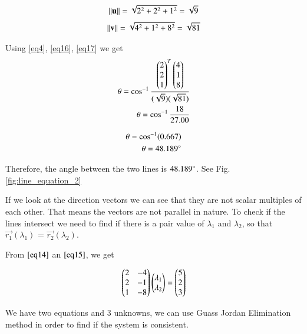 \documentclass[journal,12pt,twocolumn]{IEEEtran}
\begin{document}
\begin{enumerate}
\begin{align}\label{eq16}
	\left\lVert\mathbf{u}\right\rVert =\sqrt{2^{2}+2^{2}+1^{2}} =\sqrt{9}
\end{align}
\begin{align}\label{eq17}
	\left\lVert\mathbf{v}\right\rVert =\sqrt{4^{2}+1^{2}+8^{2}} =\sqrt{81}
\end{align}

Using \ref{eq4}, \ref{eq16}, \ref{eq17} we get
\begin{align}
	\theta = \cos ^{-1}\frac{\begin{pmatrix}2\\2\\1\end{pmatrix}^{T}\begin{pmatrix}4\\1\\8\end{pmatrix}}{(\sqrt{9})(\sqrt{81})} 
	\\
	\theta = \cos ^{-1}\frac{18}{27.00}
\end{align}

\begin{align}
	\theta = \cos ^{-1} (0.667)
	\\
	\theta = 48.189\degree
\end{align}

Therefore, the angle between the two lines is $48.189\degree$. See Fig. \ref{fig:line_equation_2}


If we look at the direction vectors we can see that they are not scalar multiples of each other. That means the vectors are not parallel in nature. To check if the lines intersect we need to find if there is a pair value of $\lambda_1$ and $\lambda_2$, so that $\vec{r_1}(\lambda_1)$ = $\vec{r_2}(\lambda_2)$.

From $\ref{eq14}$ an $\ref{eq15}$, we get

     
\begin{align}\label{eq18}
	\begin{pmatrix}
		2 & -4 \\
		2 & -1 \\
		1 & -8  
	\end{pmatrix}
	\begin{pmatrix}
		\lambda_1 \\
		\lambda_2 
	\end{pmatrix}
	=
	\begin{pmatrix}
		5 \\ 2 \\ 3
	\end{pmatrix}
\end{align}

We have two equations and 3 unknowns, we can use Guass Jordan Elimination method in order to find if the system is consistent.


\end{enumerate}
\end{document}
